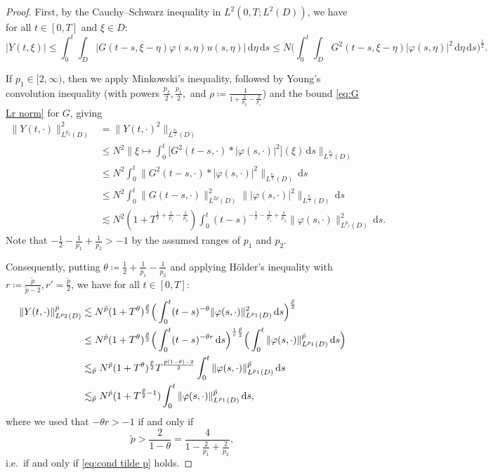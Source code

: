 \documentclass[10pt,a4paper]{amsart}
\numberwithin{equation}{section}
\newcommand{\ceqq}{\coloneqq}
\newcommand{\dd}{\,\mathrm{d}}
\begin{document}
\begin{proof}

First, by the Cauchy--Schwarz inequality in $L^2(0,T;L^2(D))$, we have for all $t\in[0,T]$ and $\xi\in D$:
\[
|Y(t,\xi)|\leq\int_0^t \int_D |G(t-s,\xi-\eta)\varphi(s,\eta)u(s,\eta)|\dd\eta \dd s
\leq N\Big(\int_0^t \int_D G^2(t-s,\xi-\eta)|\varphi(s,\eta)|^2\dd\eta \dd s\Big)^{\frac12}.
\]

If $p_1\in[2,\infty)$, then we apply Minkowski's inequality, followed by Young's convolution inequality (with powers $\frac{p_2}{2}, \frac{p_1}{2},$ and 
$\rho\ceqq \frac{1}{1+\frac{2}{p_2}-\frac{2}{p_1}}$) and the bound \eqref{eq:G Lr norm} for $G$, giving
\begin{align*}
   \|Y(t,\cdot)\|_{L^{p_2}(D)}^2  &=\|Y(t,\cdot)^2\|_{L^{\frac{p_2}{2}}(D)}\\
   &\leq N^2 \Big\|\xi\mapsto\int_0^t  \big[G^2(t-s,\cdot)*|\varphi(s,\cdot)|^2\big](\xi)  \dd s\Big\|_{L^{\frac{p_2}{2}}(D)} \\
   &\leq N^2  \int_0^t \|G^2(t-s,\cdot)*|\varphi(s,\cdot)|^2\|_{L^{\frac{p_2}{2}}(D)}\dd s \\
   &\leq  N^2 \int_0^t   \|G(t-s,\cdot)\|_{L^{2\rho}(D)}^2\||\varphi(s,\cdot)|^2\|_{L^{\frac{p_1}{2}}(D)}\dd s\\ 
   &\lesssim N^2 (1+T^{\frac12+\frac{1}{p_1}-\frac{1}{p_2}}) \int_0^t (t-s)^{-\frac12-\frac{1}{p_1}+\frac{1}{p_2}} \|\varphi(s,\cdot)\|_{L^{p_1}(D)}^{2 } \dd s. 
\end{align*} 
Note that $-\frac12-\frac{1}{p_1}+\frac{1}{p_2}>-1$ by the assumed ranges of $p_1$ and $p_2$. 

Consequently, putting $\theta\ceqq \frac12+\frac{1}{p_1}-\frac{1}{p_2}$ and applying H\"older's inequality with $r\ceqq \frac{\tilde p}{\tilde p-2}, r'=\frac{\tilde p}{2}$, we have  for all  $t\in[0,T]$:
\begin{align}
  \|Y(t,\cdot)\|_{L^{p_2}(D)}^{{\tilde p}}   
&\lesssim N^{{\tilde p}}(1+T^{\theta})^{\frac{\tilde p}{2}} \Big(\int_0^t(t-s)^{-\theta}\|\varphi(s,\cdot)\|_{L^{p_1}(D)}^2\dd s\Big)^{\frac{\tilde p}{2}} \notag\\ 
  &\leq N^{{\tilde p}}(1+T^{\theta})^{\frac{\tilde p}{2}} \Big(\int_0^t(t-s)^{-\theta r}\dd s\Big)^{\frac{1}{r}\frac{\tilde p}{2}} \Big(\int_0^t\|\varphi(s,\cdot)\|_{L^{p_1}(D)}^{\tilde p}\dd s\Big)  \notag\\ 
 &\lesssim_{{\tilde p}} N^{{\tilde p}}(1+T^{\theta})^{\frac{\tilde p}{2}}T^{\frac{\tilde p(1-\theta)-2}{2}}\int_0^t\|\varphi(s,\cdot)\|_{L^{p_1}(D)}^{{\tilde p}}\dd s\notag\\
 &\lesssim_{\tilde p} N^{{\tilde p}}(1+T^{\frac{\tilde p}{2}-1})\int_0^t\|\varphi(s,\cdot)\|_{L^{p_1}(D)}^{{\tilde p}}\dd s, \label{eq:Yestreg}
\end{align} 
where we used that $- \theta r>-1$ if and only if  
$$
\tilde p>\frac{2}{1-\theta}=\frac{4}{1-\frac{2}{p_1}+\frac{2}{p_2}},
$$
i.e.\ if and only if \eqref{eq:cond tilde p} holds. 


\end{proof}
\end{document}
